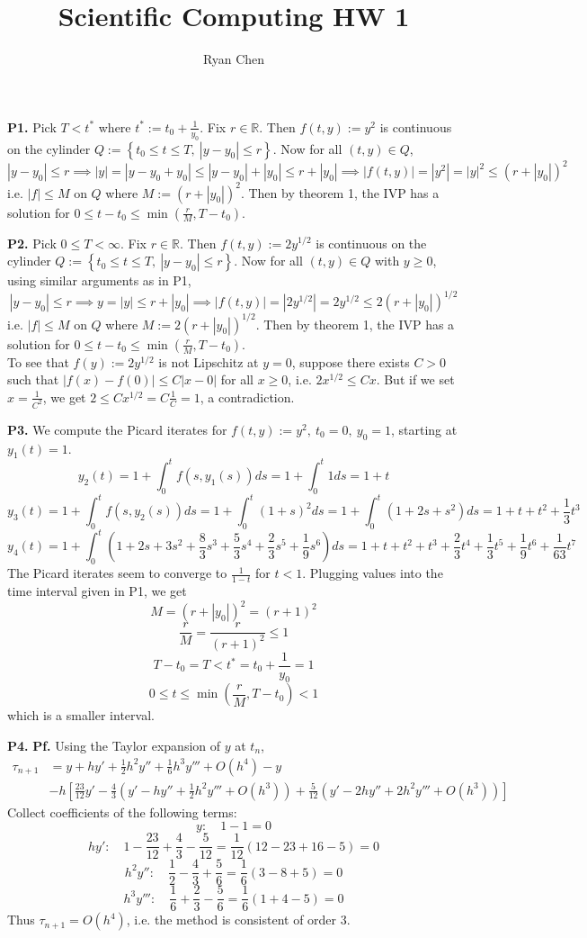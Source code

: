 \documentclass{article}
\title{Scientific Computing HW 1}
\author{Ryan Chen}
\def\mbb#1{\mathbb{#1}}
\def\tbf#1{\textbf{#1}}
\def\bR{\mbb{R}}
\newcommand{\br}[1]{\left(#1\right)}
\newcommand{\sbr}[1]{\left[#1\right]}
\newcommand{\brc}[1]{\left\{#1\right\}}
\newcommand{\pf}{\tbf{Pf. }}
\newcommand{\imp}{\implies}
\newcommand{\sep}[1][.5cm]{\vspace{#1}}
\begin{document}
\maketitle



\tbf{P1.} Pick $T<t^*$ where $t^*:=t_0+\frac{1}{y_0}$. Fix $r\in\bR$. Then $f(t,y):=y^2$ is continuous on the cylinder $Q:=\brc{t_0\le t\le T,~|y-y_0|\le r}$. Now for all $(t,y)\in Q$,
$$|y-y_0|\le r
\imp |y| = |y-y_0+y_0|
\le |y-y_0|+|y_0|
\le r+|y_0|
\imp |f(t,y)| = |y^2| = |y|^2 \le (r+|y_0|)^2$$
i.e. $|f|\le M$ on $Q$ where $M:=(r+|y_0|)^2$. Then by theorem 1, the IVP has a solution for $0\le t-t_0\le \min(\tfrac rM,T-t_0)$.
\sep



\tbf{P2.} Pick $0\le T<\infty$. Fix $r\in\bR$. Then $f(t,y):=2y^{1/2}$ is continuous on the cylinder $Q:=\brc{t_0\le t\le T,~|y-y_0|\le r}$. Now for all $(t,y)\in Q$ with $y\ge0$, using similar arguments as in P1,
$$|y-y_0|\le r
\imp y = |y| \le r+|y_0|
\imp |f(t,y)| = |2y^{1/2}| = 2y^{1/2} \le 2(r+|y_0|)^{1/2}$$
i.e. $|f|\le M$ on $Q$ where $M:=2(r+|y_0|)^{1/2}$. Then by theorem 1, the IVP has a solution for $0\le t-t_0\le \min(\frac rM,T-t_0)$.\\

To see that $f(y):=2y^{1/2}$ is not Lipschitz at $y=0$, suppose there exists $C>0$ such that $|f(x)-f(0)|\le C|x-0|$ for all $x\ge0$, i.e. $2x^{1/2}\le Cx$. But if we set $x=\frac{1}{C^2}$, we get $2\le Cx^{1/2}=C\frac1C=1$, a contradiction.
\sep



\tbf{P3.} We compute the Picard iterates for $f(t,y):=y^2,~t_0=0,~y_0=1$, starting at $y_1(t)=1$.
$$y_2(t) = 1 + \int_0^t f(s,y_1(s))ds = 1 + \int_0^t 1ds = 1 + t$$
$$y_3(t) = 1 + \int_0^t f(s,y_2(s))ds = 1 + \int_0^t (1+s)^2ds = 1 + \int_0^t (1+2s+s^2)ds = 1+t+t^2+\frac13t^3$$
$$y_4(t) = 1 + \int_0^t\br{1+2s+3s^2+\frac83s^3+\frac53s^4+\frac23s^5+\frac19s^6}ds = 1+t+t^2+t^3+\frac23t^4+\frac13t^5+\frac19t^6+\frac1{63}t^7$$
The Picard iterates seem to converge to $\frac1{1-t}$ for $t<1$. Plugging values into the time interval given in P1, we get
$$M = (r+|y_0|)^2 = (r+1)^2$$
$$\frac rM = \frac{r}{(r+1)^2} \le 1$$
$$T-t_0 = T < t^* = t_0+\frac{1}{y_0} = 1$$
$$0 \le t \le \min\br{\frac rM,T-t_0} < 1$$
which is a smaller interval.
\sep



\tbf{P4.} \pf Using the Taylor expansion of $y$ at $t_n$,
\begin{align*}
	\tau_{n+1} &= y + hy' + \frac12h^2y'' + \frac16h^3y''' + O(h^4) - y \\
	& - h\sbr{\frac{23}{12}y' - \frac43\br{y' - hy'' + \frac12h^2y''' + O(h^3)} + \frac{5}{12}\br{y' - 2hy'' + 2h^2y''' + O(h^3)}}
\end{align*}
Collect coefficients of the following terms:
$$y: \quad 1 - 1 = 0$$
$$hy': \quad 1 - \frac{23}{12} + \frac43 - \frac{5}{12} = \frac{1}{12}(12-23+16-5) = 0$$
$$h^2y'': \quad \frac12 - \frac43 + \frac56 = \frac16(3-8+5) = 0$$
$$h^3y''': \quad \frac16 + \frac23 - \frac56 = \frac16(1+4-5) = 0$$
Thus $\tau_{n+1}=O(h^4)$, i.e. the method is consistent of order 3.
\sep
\end{document}
